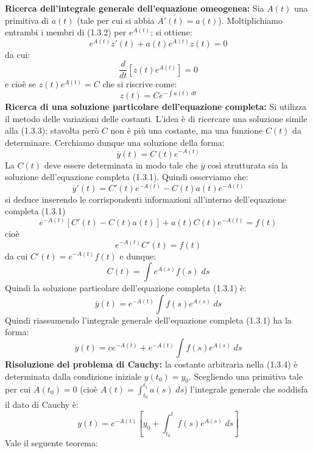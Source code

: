 \documentclass[a4paper]{article}
\numberwithin{equation}{subsection}
\begin{document}
\vspace{1em}
\noindent
\textbf{Ricerca dell'integrale generale dell'equazione omeogenea:} 
Sia $A(t)$ una primitiva di $a(t)$ (tale per cui si abbia $A'(t) = a(t)$). Moltiplichiamo entrambi i membri di (1.3.2) per $e^{A(t)}$; si ottiene:
\begin{equation*}
    e^{A(t)}z'(t) + a(t)e^{A(t)}z(t) = 0
\end{equation*}
da cui:
\[\frac{d}{dt}[z(t)e^{A(t)}] = 0\]
e cioè se $z(t)e^{A(t)} =  C$ che si riscrive come:
\begin{equation}
    z(t) = Ce^{-\int a(t) \; dt}
\end{equation} 
\textbf{Ricerca di una soluzione particolare dell'equazione completa:} 
Si utilizza il metodo delle variazioni delle costanti.
L'idea è di ricercare una soluzione simile alla (1.3.3); stavolta però 
$C$ non è più una costante, ma una funzione $C(t)$ da determinare. Cerchiamo
dunque una soluzione della forma:
\[\overline{y}(t) = C(t)e^{-A(t)}\]
La $C(t)$ deve essere determinata in modo tale che $\overline{y}$ così strutturata sia la soluzione
dell'equazione completa (1.3.1). Quindi osserviamo che:
\[\overline{y}'(t) = C'(t)e^{-A(t)} - C(t)a(t)e^{-A(t)}\]
si deduce inserendo le corrispondenti informazioni all'interno dell'equazione completa (1.3.1)
\[e^{-A(t)}[C'(t) - C(t)a(t)] + a(t)C(t)e^{-A(t)} = f(t)\]
cioè
\[e^{-A(t)}C'(t) = f(t)\]
da cui $C'(t) = e^{-A(t)}f(t)$ e dunque:
\[C(t) = \int e^{A(s)}f(s) \; ds\]
Quindi la soluzione particolare dell'equazione completa (1.3.1) è:
\[\overline{y}(t) = e^{-A(t)} \int f(s)e^{A(s)} \; ds\]
Quindi riassumendo l'integrale generale dell'equazione completa (1.3.1) ha la forma:
\begin{equation}
    y(t) = ce^{-A(t)} + e^{-A(t)} \int f(s)e^{A(s)} \; ds 
\end{equation}
\textbf{Risoluzione del problema di Cauchy:} la costante arbitraria nella (1.3.4) 
è determinata dalla condizione iniziale $y(t_0) = y_0$. Scegliendo una primitiva
tale per cui $A(t_0) = 0$ (cioè $A(t) = \int_{t_0}^{t_1} a(s) \; ds$) l'integrale
generale che soddisfa il dato di Cauchy è:
\begin{equation}
    y(t) = e^{-A(t)} \left[ y_0 + \int_{t_0}^t f(s)e^{A(s)} \; ds \right]
\end{equation}
Vale il seguente teorema:
\end{document}
